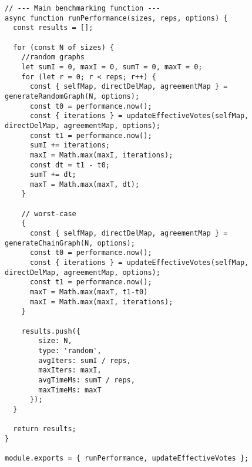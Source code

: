 \begin{verbatim}
// --- Main benchmarking function ---
async function runPerformance(sizes, reps, options) {
  const results = [];

  for (const N of sizes) {
    //random graphs
    let sumI = 0, maxI = 0, sumT = 0, maxT = 0;
    for (let r = 0; r < reps; r++) {
      const { selfMap, directDelMap, agreementMap } = generateRandomGraph(N, options);
      const t0 = performance.now();
      const { iterations } = updateEffectiveVotes(selfMap, directDelMap, agreementMap, options);
      const t1 = performance.now();
      sumI += iterations;
      maxI = Math.max(maxI, iterations);
      const dt = t1 - t0;
      sumT += dt;
      maxT = Math.max(maxT, dt);
    }

    // worst-case
    {
      const { selfMap, directDelMap, agreementMap } = generateChainGraph(N, options);
      const t0 = performance.now();
      const { iterations } = updateEffectiveVotes(selfMap, directDelMap, agreementMap, options);
      const t1 = performance.now();
      maxT = Math.max(maxT, t1-t0)
      maxI = Math.max(maxI, iterations);
    }

    results.push({
        size: N,
        type: 'random',
        avgIters: sumI / reps,
        maxIters: maxI,
        avgTimeMs: sumT / reps,
        maxTimeMs: maxT
      });
  }

  return results;
}

module.exports = { runPerformance, updateEffectiveVotes };

\end{verbatim}
